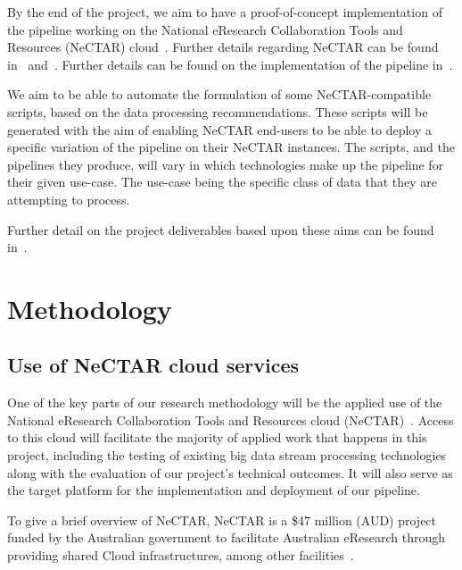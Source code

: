 \documentclass[a4paper,11pt]{article}
\begin{document}
By the end of the project, we aim to have a proof-of-concept implementation of the pipeline working on the National
eResearch Collaboration Tools and Resources (NeCTAR) cloud~\cite{web:Nectar}. Further details regarding NeCTAR can be
found in~ and~. Further details can be found on the
implementation of the pipeline in~.

We aim to be able to automate the formulation of some NeCTAR-compatible scripts, based on the data processing
recommendations. These scripts will be generated with the aim of enabling NeCTAR end-users to be able to deploy a
specific variation of the pipeline on their NeCTAR instances. The scripts, and the pipelines they produce, will vary in
which technologies make up the pipeline for their given use-case. The use-case being the specific class of data that
they are attempting to process.

Further detail on the project deliverables based upon these aims can be found in~.





\section{Methodology} %
\label{sec:methodology}

\subsection{Use of NeCTAR cloud services} %
\label{sub:use_of_nectar_cloud_services}

One of the key parts of our research methodology will be the applied use of the National eResearch Collaboration Tools
and Resources cloud (NeCTAR)~\cite{web:Nectar}. Access to this cloud will facilitate the majority of applied work that
happens in this project, including the testing of existing big data stream processing technologies along with the
evaluation of our project's technical outcomes. It will also serve as the target platform for the implementation and
deployment of our pipeline.

To give a brief overview of NeCTAR, NeCTAR is a \$47 million (AUD) project funded by the Australian government to
facilitate Australian eResearch through providing shared Cloud infrastructures, among other
facilities~\cite{sinnott_towards_2011}.
\end{document}
